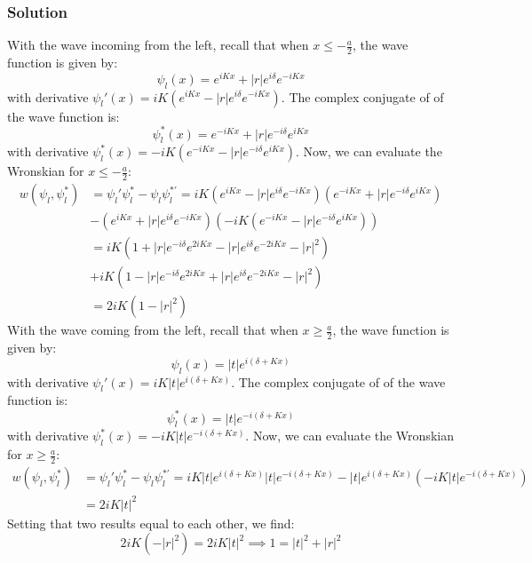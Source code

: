 \documentclass[12pt]{article}
\begin{document}
\subsubsection{Solution}
With the wave incoming from the left, recall that when $x \leq -\frac{a}{2}$, the wave function is given by:
\begin{equation}
    \psi_l(x) = e^{iKx} + |r|e^{i\delta}e^{-iKx}
\end{equation}
with derivative $\psi_l'(x) = iK\left(e^{iKx} - |r|e^{i\delta}e^{-iKx}\right)$. The complex conjugate of of the wave function is:
\begin{equation}
    \psi_l^*(x) = e^{-iKx} + |r|e^{-i\delta}e^{iKx}
\end{equation}
with derivative $\psi_l^*(x) = -iK\left(e^{-iKx} - |r|e^{-i\delta}e^{iKx}\right)$. Now, we can evaluate the Wronskian for $x \leq -\frac{a}{2}$:
\begin{align}
    w(\psi_l, \psi_l^*) &= \psi_l'\psi_l^* - \psi_l\psi_l^{*'} = iK\left(e^{iKx} - |r|e^{i\delta}e^{-iKx}\right)\left(e^{-iKx} + |r|e^{-i\delta} e^{iKx}\right)\\
    &- \left(e^{iKx} + |r|e^{i\delta}e^{-iKx}\right)\left(-iK\left(e^{-iKx} - |r|e^{-i\delta}e^{iKx}\right)\right)\\
    &= iK\left(1 + |r|e^{-i\delta}e^{2iKx} - |r|e^{i\delta}e^{-2iKx} - |r|^2\right)\\
    &+ iK\left(1 - |r|e^{-i\delta}e^{2iKx} + |r|e^{i\delta}e^{-2iKx} - |r|^2\right)\\
    &= 2iK\left(1 - |r|^2\right)
\end{align}
With the wave coming from the left, recall that when $x \geq \frac{a}{2}$, the wave function is given by:
\begin{equation}
    \psi_l(x) = |t|e^{i\left(\delta + Kx\right)}
\end{equation}
with derivative $\psi_l'(x) = iK|t|e^{i\left(\delta + Kx\right)}$. The complex conjugate of of the wave function is:
\begin{equation}
    \psi_l^*(x) = |t|e^{-i\left(\delta + Kx\right)}
\end{equation}
with derivative $\psi_l^*(x) = -iK|t|e^{-i\left(\delta + Kx\right)}$. Now, we can evaluate the Wronskian for $x \geq \frac{a}{2}$:
\begin{align}
    w(\psi_l, \psi_l^*) &= \psi_l'\psi_l^* - \psi_l\psi_l^{*'} = iK|t|e^{i\left(\delta + Kx\right)}|t|e^{-i\left(\delta + Kx\right)} - |t|e^{i\left(\delta + Kx\right)}\left(-iK|t|e^{-i\left(\delta + Kx\right)}\right)\\
    &= 2iK|t|^2
\end{align}
Setting that two results equal to each other, we find:
\begin{equation}
    2iK\left( - |r|^2\right) = 2iK|t|^2 \implies 1 = |t|^2 + |r|^2
\end{equation}
\end{document}
